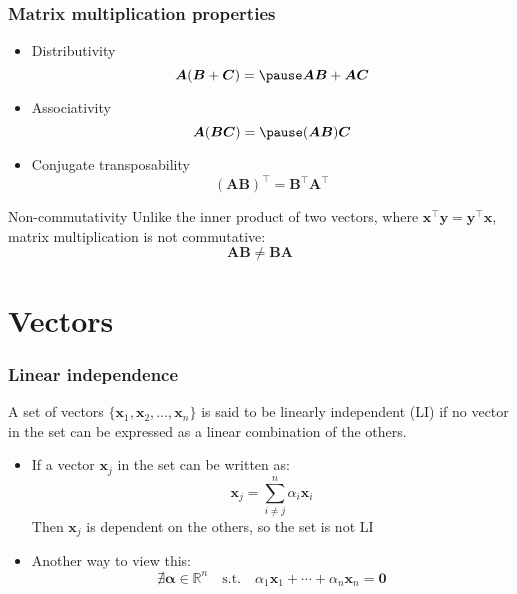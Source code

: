 \documentclass[smaller]{beamer}
\newcommand{\?}{\stackrel{?}{=}}
\newcommand{\mb}{\mathbb}
\newcommand{\tr}{^{\top}}
\begin{document}
\begin{frame}
  \frametitle{Matrix multiplication properties}
  \pause
  \begin{itemize}[<+->]
  \item Distributivity \pause
    \begin{equation}
      \bm A(\bm B + \bm C) = \pause \bm{AB} + \bm{AC}
    \end{equation}
    \pause
  \item Associativity \pause
    \begin{equation}
    \bm A(\bm{BC}) = \pause (\bm{AB})\bm C
  \end{equation}
  \pause

\item Conjugate transposability \pause
  \begin{equation}
    (\bm{AB})\tr = {\bm B\tr\bm A\tr}
  \end{equation}
  
\end{itemize}
\pause

\begin{alertblock}{Non-commutativity}
  Unlike the inner product of two vectors, where $\bm x\tr\bm y = \bm y\tr\bm x$, \pause
  matrix multiplication is not commutative:\pause
  \begin{equation}
    \bm{AB} \ne \bm{BA}
  \end{equation}
\end{alertblock}
\end{frame}


\section{Vectors}



\begin{frame}
	\frametitle{Linear independence}
	
	\pause
	
	A set of vectors $\{\bm x_1, \bm x_2, \ldots, \bm x_n\}$ is said to
	be linearly independent (LI) if no vector in the set can be
	expressed as a linear combination of the others.
	\pause
	
	\begin{itemize}
		\item If a vector $\bm x_j$ in the set can be written as:
		\pause
		\begin{equation}
			\bm x_j = \sum_{i\ne j}^n \alpha_i \bm x_i
		\end{equation}
		Then $\bm x_j$ is dependent on the others, so the set is not LI
		\pause
		
		\item Another way to view this:
		\pause
		\begin{equation}
			\nexists \bm \alpha \in \mb{R}^n \quad \text{s.t.}\quad \alpha_1\bm x_1 +
			\cdots + \alpha_n\bm x_n = \bm 0
		\end{equation}
		
	\end{itemize}
	
\end{frame}
\end{document}
